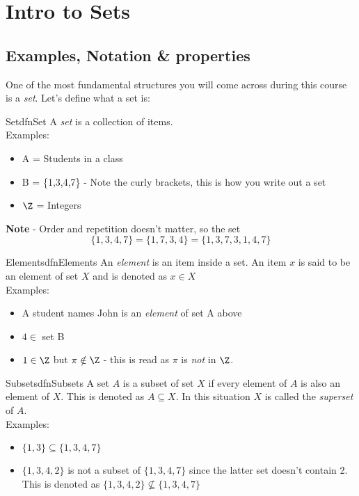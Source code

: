\chapter{Intro to Sets}

\section{Examples, Notation \& properties}
One of the most fundamental structures you will come across during this course is a \emph{set}. Let's define what a set is:

\begin{dfn}[label={def:set}]{Set}{dfnSet}
    A \emph{set} is a collection of items.\\
    Examples:
    \begin{itemize}
        \item A = Students in a class
        \item B = \{1,3,4,7\} - Note the curly brackets, this is how you write out a set
        \item $\Z$ = Integers
    \end{itemize}

    \textbf{Note} - Order and repetition doesn't matter, so the set $$\{1,3,4,7\} = \{1,7,3,4\} = \{1,3,7,3,1,4,7\}$$
\end{dfn}

\begin{dfn}[label={def:elements}]{Elements}{dfnElements}
    An \emph{element} is an item inside a set. An item $x$ is said to be an element of set $X$ and is denoted as $x \in X$\\
    Examples:
    \begin{itemize}
        \item A student names John is an \emph{element} of set A above
        \item $ 4 \in $ set B
        \item $ 1 \in \Z$ but $\pi \notin \Z$ - this is read as $\pi$ is \emph{not} in $\Z$.
    \end{itemize}
\end{dfn}

\begin{dfn}[label={def:subset}]{Subsets}{dfnSubsets}
    A set $A$ is a subset of set $X$ if every element of $A$ is also an element of $X$. This is denoted as $A \subseteq X$. In this situation $X$ is called the \emph{superset} of $A$. \\
    Examples:
    \begin{itemize}
        \item $\{1,3\} \subseteq \{1,3,4,7\}$
        \item $\{1,3,4,2\}$ is not a subset of $\{1,3,4,7\}$ since the latter set doesn't contain 2. This is denoted as $\{1,3,4,2\} \nsubseteq \{1,3,4,7\}$
    \end{itemize}
\end{dfn}

